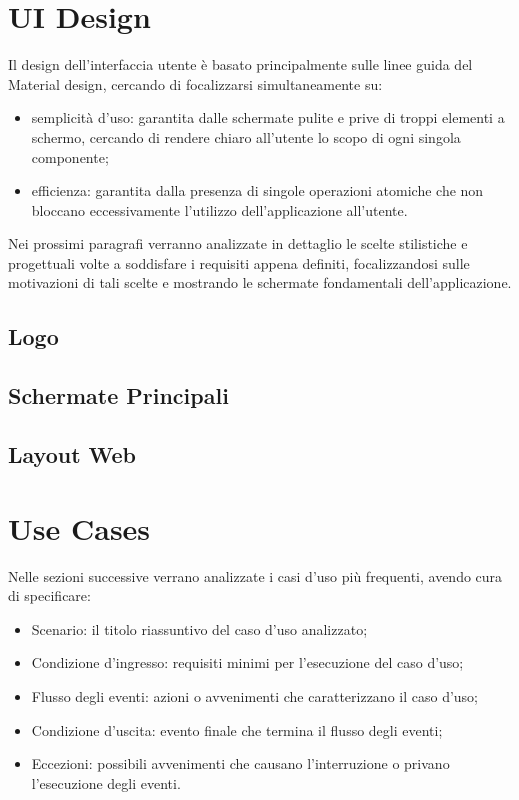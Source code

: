 \documentclass[12pt,a4paper,twoside,openright,titlepage]{book}
\begin{document}
\section{UI Design}
Il design dell'interfaccia utente è basato principalmente sulle linee guida del Material design, cercando di focalizzarsi simultaneamente su:
\begin{itemize}
\item semplicità d'uso: garantita dalle schermate pulite e prive di troppi elementi a schermo, cercando di rendere chiaro all'utente lo scopo di ogni singola componente;
\item efficienza: garantita dalla presenza di singole operazioni atomiche che non bloccano eccessivamente l'utilizzo dell'applicazione all'utente.
\end{itemize}
Nei prossimi paragrafi verranno analizzate in dettaglio le scelte stilistiche e progettuali volte a soddisfare i requisiti appena definiti, focalizzandosi sulle motivazioni di tali scelte e mostrando le schermate fondamentali dell'applicazione.

\subsection{Logo}
\subsection{Schermate Principali}
\subsection{Layout Web}

\section{Use Cases}
Nelle sezioni successive verrano analizzate i casi d'uso più frequenti, avendo cura di specificare:
\begin{itemize}
\item Scenario: il titolo riassuntivo del caso d'uso analizzato;
\item Condizione d'ingresso: requisiti minimi per l'esecuzione del caso d'uso;
\item Flusso degli eventi: azioni o avvenimenti che caratterizzano il caso d'uso;
\item Condizione d'uscita: evento finale che termina il flusso degli eventi;
\item Eccezioni: possibili avvenimenti che causano l'interruzione o privano l'esecuzione degli eventi.
\end{itemize}
\end{document}
